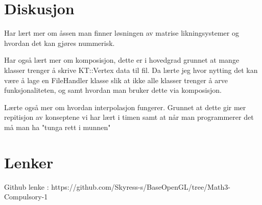 ﻿\documentclass[14]{article}
\begin{document}
\begin{flushleft}
        \section{Diskusjon}
        Har lært mer om åssen man finner løsningen av matrise likningsystemer og hvordan det kan gjøres nummerisk.
        
        
        Har også lært mer om komposisjon, dette er i hovedgrad grunnet at mange klasser trenger å skrive KT::Vertex
        data til fil. Da lærte jeg hvor nytting det kan være å lage en FileHandler klasse slik at ikke alle klasser trenger 
        å arve funksjonaliteten, og samt hvordan man bruker dette via komposisjon.
        
        Lærte også mer om hvordan interpolasjon fungerer. Grunnet at dette gir mer repitisjon av konseptene vi har lært i timen
        samt at når man programmerer det må man ha "tunga rett i munnen"
       
        \section{Lenker}
        Github lenke : https://github.com/Skyress-s/BaseOpenGL/tree/Math3-Compulsory-1
    \end{flushleft}
\end{document}
